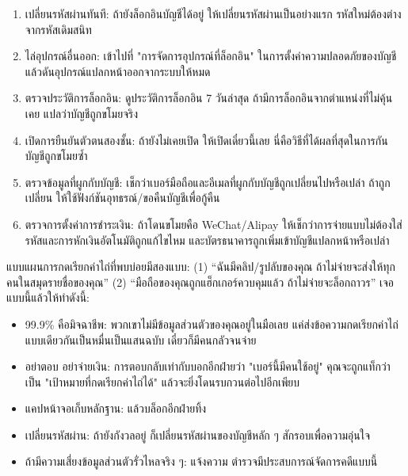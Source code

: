 
\begin{enumerate}
  \item เปลี่ยนรหัสผ่านทันที: ถ้ายังล็อกอินบัญชีได้อยู่ ให้เปลี่ยนรหัสผ่านเป็นอย่างแรก รหัสใหม่ต้องต่างจากรหัสเดิมสนิท
  \item ไล่อุปกรณ์อื่นออก: เข้าไปที่ "การจัดการอุปกรณ์ที่ล็อกอิน" ในการตั้งค่าความปลอดภัยของบัญชี แล้วดันอุปกรณ์แปลกหน้าออกจากระบบให้หมด
  \item ตรวจประวัติการล็อกอิน: ดูประวัติการล็อกอิน 7 วันล่าสุด ถ้ามีการล็อกอินจากตำแหน่งที่ไม่คุ้นเคย แปลว่าบัญชีถูกขโมยจริง
  \item เปิดการยืนยันตัวตนสองชั้น: ถ้ายังไม่เคยเปิด ให้เปิดเดี๋ยวนี้เลย นี่คือวิธีที่ได้ผลที่สุดในการกันบัญชีถูกขโมยซ้ำ
  \item ตรวจข้อมูลที่ผูกกับบัญชี: เช็กว่าเบอร์มือถือและอีเมลที่ผูกกับบัญชีถูกเปลี่ยนไปหรือเปล่า ถ้าถูกเปลี่ยน ให้ใช้ฟังก์ชันอุทธรณ์/ขอคืนบัญชีเพื่อกู้คืน
  \item ตรวจการตั้งค่าการชำระเงิน: ถ้าโดนขโมยคือ WeChat/Alipay ให้เช็กว่าการจ่ายแบบไม่ต้องใส่รหัสและการหักเงินอัตโนมัติถูกแก้ไขไหม และบัตรธนาคารถูกเพิ่มเข้าบัญชีแปลกหน้าหรือเปล่า
\end{enumerate}


แบบแผนการกดเรียกค่าไถ่ที่พบบ่อยมีสองแบบ: (1) “ฉันมีคลิป/รูปลับของคุณ ถ้าไม่จ่ายจะส่งให้ทุกคนในสมุดรายชื่อของคุณ” (2) “มือถือของคุณถูกแฮ็กเกอร์ควบคุมแล้ว ถ้าไม่จ่ายจะล็อกถาวร” เจอแบบนี้แล้วให้ทำดังนี้:

\begin{itemize}
  \item 99.9\% คือมิจฉาชีพ: พวกเขาไม่มีข้อมูลส่วนตัวของคุณอยู่ในมือเลย แค่ส่งข้อความกดเรียกค่าไถ่แบบเดียวกันเป็นหมื่นเป็นแสนฉบับ เดี๋ยวก็มีคนกลัวจนจ่าย
  \item อย่าตอบ อย่าจ่ายเงิน: การตอบกลับเท่ากับบอกอีกฝ่ายว่า "เบอร์นี้มีคนใช้อยู่" คุณจะถูกแท็กว่าเป็น "เป้าหมายที่กดเรียกค่าไถ่ได้" แล้วจะยิ่งโดนรบกวนต่อไปอีกเพียบ
  \item แคปหน้าจอเก็บหลักฐาน: แล้วบล็อกอีกฝ่ายทิ้ง
  \item เปลี่ยนรหัสผ่าน: ถ้ายังกังวลอยู่ ก็เปลี่ยนรหัสผ่านของบัญชีหลัก ๆ สักรอบเพื่อความอุ่นใจ
  \item ถ้ามีความเสี่ยงข้อมูลส่วนตัวรั่วไหลจริง ๆ: แจ้งความ ตำรวจมีประสบการณ์จัดการคดีแบบนี้
\end{itemize}

